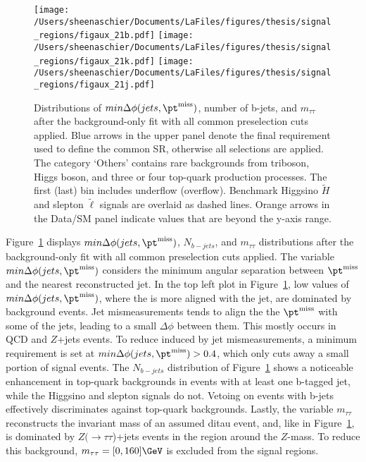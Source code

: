     \begin{figure}%
  \begin{center}
  \texttt{[image: /Users/sheenaschier/Documents/LaFiles/figures/thesis/signal\_regions/figaux\_21b.pdf]}
   \texttt{[image: /Users/sheenaschier/Documents/LaFiles/figures/thesis/signal\_regions/figaux\_21k.pdf]}
      \texttt{[image: /Users/sheenaschier/Documents/LaFiles/figures/thesis/signal\_regions/figaux\_21j.pdf]}
   \end{center}
 \caption{Distributions of $min\Delta\phi(jets, \pt^{\mathrm{miss}})$, number of b-jets, and $m_{\tau\tau}$ after the background-only fit with all common preselection cuts applied.  Blue arrows in the upper panel denote the final requirement used to define the common SR, otherwise all selections are applied. The category `Others' contains rare backgrounds from triboson, Higgs boson, and three or four top-quark production processes. The first (last) bin includes underflow (overflow).  Benchmark Higgsino $\tilde H$ and slepton $\tilde\ell$ signals are overlaid as dashed lines. Orange arrows in the Data/SM panel indicate values that are beyond the y-axis range.}
 \label{fig:sr:cm3}
 \end{figure}
Figure~\ref{fig:sr:cm3} displays $min\Delta\phi(jets, \pt^{\mathrm{miss}})$, $N_{b-jets}$, and $m_{\tau\tau}$ distributions after the background-only fit with all common preselection cuts applied.  The variable $min\Delta\phi(jets, \pt^{\mathrm{miss}})$ considers the minimum angular separation between $\pt^{\mathrm{miss}}$ and the nearest reconstructed jet.  In the top left plot in Figure~\ref{fig:sr:cm3}, low values of $min\Delta\phi(jets, \pt^{\mathrm{miss}})$, where the \met is more aligned with the jet, are dominated by background events.  Jet mismeasurements tends to align the the $\pt^{\mathrm{miss}}$ with some of the jets, leading to a small $\Delta\phi$ between them.  This mostly occurs in QCD and $Z$+jets events.  To reduce \met{} induced by jet mismeasurements, a minimum requirement is set at $min\Delta\phi(jets, \pt^{\mathrm{miss}}) > 0.4$, which only cuts away a small portion of signal events.  The $N_{b-jets}$ distribution of Figure~\ref{fig:sr:cm3} shows a noticeable enhancement in top-quark backgrounds in events with at least one b-tagged jet, while the Higgsino and slepton signals do not.  Vetoing on events with b-jets effectively discriminates against top-quark backgrounds.  Lastly, the variable $m_{\tau\tau}$ reconstructs the invariant mass of an assumed ditau event, and, like in Figure~\ref{fig:sr:cm3}, is dominated by $Z(\rightarrow\tau\tau$)+jets events in the region around the $Z$-mass.  To reduce this background, $m_{\tau\tau} = [0, 160]\GeV$ is excluded from the signal regions.  
 

